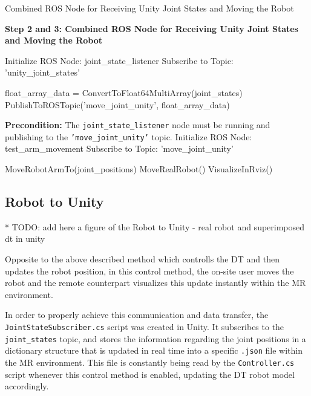 \begin{algorithm}
    \caption{Combined ROS Node for Receiving Unity Joint States and Moving the Robot}\label{alg:combined_ros_node}
    \begin{algorithmic}[1]
        \State \textbf{Step 2 and 3: Combined ROS Node for Receiving Unity Joint States and Moving the Robot}
        
        \State Initialize ROS Node: joint\_state\_listener
        \State Subscribe to Topic: 'unity\_joint\_states'
        
            \State float\_array\_data = ConvertToFloat64MultiArray(joint\_states)
            \State PublishToROSTopic('move\_joint\_unity', float\_array\_data)
        \EndWhile
        
        \State \textbf{Precondition:} The \texttt{joint\_state\_listener} node must be running and publishing to the \texttt{'move\_joint\_unity'} topic.
        \State Initialize ROS Node: test\_arm\_movement
        \State Subscribe to Topic: 'move\_joint\_unity'
        
            \State MoveRobotArmTo(joint\_positions)
                \State MoveRealRobot()
            \Else
                \State VisualizeInRviz()
            \EndIf
        \EndWhile
    \end{algorithmic}
\end{algorithm}


    
\subsection{Robot to Unity}
* TODO: add here a figure of the Robot to Unity - real robot and superimposed dt in unity

Opposite to the above described method which controlls the \ac{DT} and then updates the robot position, in this control method, the on-site user moves the robot and the remote counterpart visualizes this update instantly within the \ac{MR} environment.

In order to properly achieve this communication and data transfer, the \texttt{JointStateSubscriber.cs} script was created in Unity. It subscribes to the \texttt{joint\_states} topic, and stores the information regarding the joint positions in a dictionary structure that is updated in real time into a specific \texttt{.json} file within the \ac{MR} environment. This file is constantly being read by the \texttt{Controller.cs} script whenever this control method is enabled, updating the \ac{DT} robot model accordingly.

